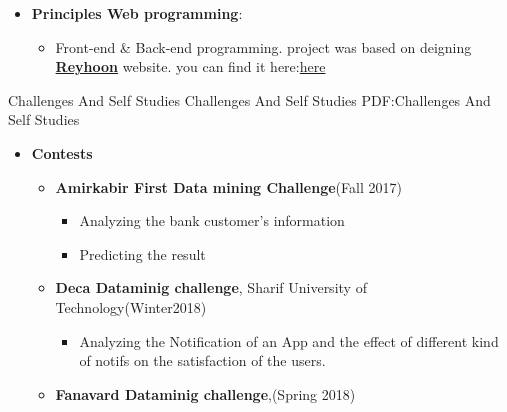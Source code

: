\documentclass[letterpaper,MMMyyyy,nonstopmode]{simpleresumecv}
\begin{document}
\begin{Body}
\begin{itemize}
\item \textbf{Principles Web programming}: 
	    \begin{itemize}
        \item 
Front-end & Back-end programming.
project was based on deigning \href{https://www.reyhoon.com/} {\textbf{Reyhoon}} website. you can find it here:\href{https://github.com/Yasaman1997/Internet_Engineering}{here}
     \end{itemize}
     

  
  
  
     
  \end{itemize}	
 	



\Section
{Challenges And Self Studies}
{Challenges And Self Studies}
{PDF:Challenges And Self Studies}

\Entry
\begin{itemize}
    \item \textbf{Contests}

\begin{itemize}

\item \textbf {Amirkabir First Data mining Challenge}(Fall 2017)
    	
   \begin{itemize}
	   
     \item Analyzing the bank customer's  information
     \item Predicting the result
   
    \end{itemize}
	
		

\item \textbf {Deca Dataminig challenge}, Sharif University of Technology(Winter2018)
 \begin{itemize}
	   
     \item Analyzing the Notification of an App and the effect of different kind of notifs on the satisfaction of the users.
    
   
    \end{itemize}
	
	
\item \textbf {Fanavard Dataminig challenge},(Spring 2018)
 \begin{itemize}
	   

\end{itemize}
\end{itemize}
\end{itemize}
\end{Body}
\end{document}
